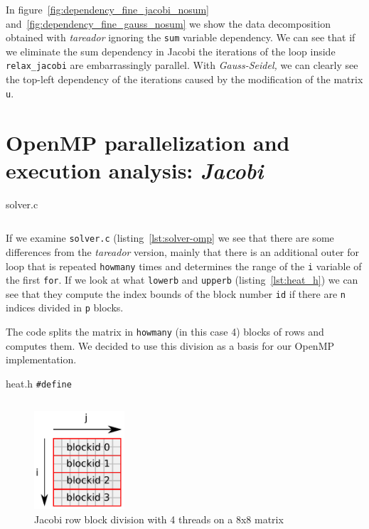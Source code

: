In figure~\ref{fig:dependency_fine_jacobi_nosum} and~\ref{fig:dependency_fine_gauss_nosum}
we show the data decomposition obtained with \emph{tareador} ignoring the \texttt{sum} variable
dependency.
We can see that if we eliminate the sum dependency in Jacobi the iterations of the
loop inside \texttt{relax\_jacobi} are embarrassingly parallel. With \emph{Gauss-Seidel,}
we can clearly see the top-left dependency of the iterations caused by the modification
of the matrix \texttt{u}.


\pagebreak
\section{OpenMP parallelization and execution analysis: \emph{Jacobi}}

\begin{listing}[H]
    \caption{solver.c}%
    \label{lst:solver-omp}
    \inputminted[firstline=17,lastline=39]{c}{code/solver-omp-orig.c}
\end{listing}

If we examine \texttt{solver.c} (listing~\ref{lst:solver-omp} we see that there are some differences 
from the \emph{tareador} version,
mainly that there is an additional outer for loop that is repeated \texttt{howmany} times and determines the
range of the \texttt{i} variable of the first \texttt{for}. If we look at what \texttt{lowerb} and
\texttt{upperb} (listing~\ref{lst:heat_h}) we can see that they compute the index bounds of the block
number \texttt{id} if there are \texttt{n} indices divided in \texttt{p} blocks.

The code splits the matrix in \texttt{howmany} (in this case 4) blocks of rows and computes them.
We decided to use this division as a basis for our OpenMP implementation.

\begin{listing}[H]
    \caption{heat.h \texttt{\#define}}%
    \label{lst:heat_h}
    \inputminted[firstline=59,lastline=61]{c}{code/heat.h}
\end{listing}


\begin{figure}[H]
    \centering
    \includegraphics[width=0.3\textwidth]{jacobi_blocks}
    \caption{Jacobi row block division with 4 threads on a 8x8 matrix}%
    \label{fig:blocks-jacobi}
\end{figure}

